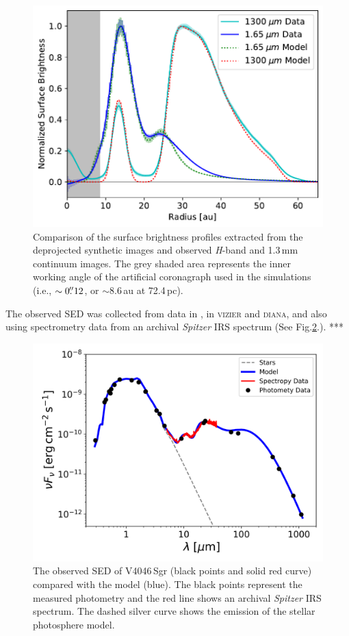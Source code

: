 \documentclass[letters,usenatbib,times]{mnras}
\begin{document}
\begin{figure}
	\includegraphics[width=\columnwidth]{comp_fig_all_profiles_au.pdf}
    \caption{Comparison of the surface brightness profiles extracted from the deprojected synthetic images and observed \textit{H}-band and 1.3\,mm continuum images. The grey shaded area represents the inner working angle of the artificial coronagraph used in the simulations (i.e., $\sim0\hbox{$.\!\!^{\prime\prime}$} 12$, or $\sim$8.6\,au at 72.4\,pc).}
    \label{fig:radprofiles}
\end{figure}

The observed SED was collected from data  in \citet{Jensen_97}, in \textsc{vizier} and \textsc{diana}, and also using spectrometry data from an archival \textit{Spitzer} IRS spectrum (See Fig.\ref{fig:SED}.). ***

\begin{figure}
	\centering
	\includegraphics[width=\columnwidth]{SED_.png}
    \caption{The observed SED of V4046\,Sgr  (black points and solid red curve) compared with the model (blue). The black points represent the measured photometry and the red line shows an archival \textit{Spitzer} IRS spectrum. The dashed silver curve shows the emission of the stellar photosphere model.}
    \label{fig:SED}
\end{figure}
\end{document}

